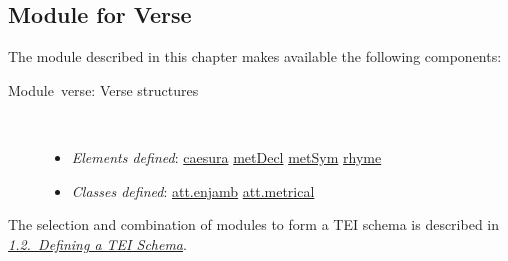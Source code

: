 \subsection[{Module for Verse}]{Module for Verse}\label{VESTR}\par
The module described in this chapter makes available the following components: \begin{description}

\item[{Module verse: Verse structures}]\hspace{1em}\hfill\linebreak
\mbox{}\\[-10pt] \begin{itemize}
\item {\itshape Elements defined}: \hyperref[TEI.caesura]{caesura} \hyperref[TEI.metDecl]{metDecl} \hyperref[TEI.metSym]{metSym} \hyperref[TEI.rhyme]{rhyme}
\item {\itshape Classes defined}: \hyperref[TEI.att.enjamb]{att.enjamb} \hyperref[TEI.att.metrical]{att.metrical}
\end{itemize} 
\end{description}   The selection and combination of modules to form a TEI schema is described in \textit{\hyperref[STIN]{1.2.\ Defining a TEI Schema}}.